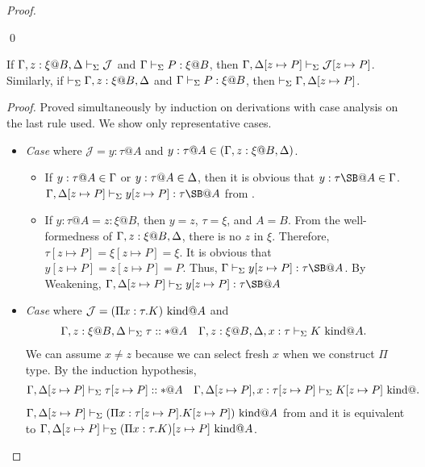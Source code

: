 \begin{proof}
\begin{itemize}
	\end{itemize}
\qed\end{proof}

\begin{theorem}
	If $\G, z:\xi@B, \D \V \mathcal{J}$ and $\Gamma\vdash_\Sigma P:\xi @B$, then $\Gamma, \Delta[z \mapsto P] \vdash_\Sigma \mathcal{J}[z \mapsto P]$.  Similarly, if $\V \G, z:\xi@B, \D$ and
	$\Gamma\vdash_\Sigma P:\xi @B$, then $\vdash_\Sigma \Gamma, \Delta[z \mapsto P]$.
\end{theorem}
\begin{proof}
	Proved simultaneously by induction on derivations with case analysis on the last rule used.
	We show only representative cases.
	\begin{itemize}
										
		\newcommand{\SB}{[z \mapsto P]}
		\newcommand{\GG}{\G}
		\newcommand{\GGV}{\G \V}
										
		\item[] \textit{Case} \TVar{} where \(\mathcal{J} = y:\tau@A\) and \(y:\tau@A \in (\G, z:\xi@B, \D)\).
		      \begin{itemize}
		      	\item If $y:\tau@A \in \G$ or $y:\tau@A \in \D$, then it is obvious that $y:\tau\SB@A \in \GG$.
		      	      \(\G,\D\SB \V y\SB:\tau\SB@A\) from \TVar.
		      	      		      	      	      	      		      	      	      		      	      
		      	\item If $y:\tau@A = z:\xi@B$, then
		      	      $y = z$, $\tau = \xi$, and $A = B$.
		      	      From the well-formedness of \( \G, z:\xi@B,\D \), there is no $z$ in $\xi$.
		      	      Therefore, $\tau\SB = \xi\SB = \xi$.
		      	      It is obvious that $y\SB = z\SB = P$.
		      	      Thus, $\G \V y\SB : \tau\SB@A$.
		      	      By Weakening, $\G,\D\SB \V y\SB : \tau\SB@A$
		      	      		      	      
		      \end{itemize}
		      \vspace{3mm}
		      
		\item[] \textit{Case} \WAbs{} where \( \mathcal{J} =  (\Pi x:\tau.K) \text{\ kind} @A\) and
		      \begin{align*}	      	      	      
		      	  & \G, z:\xi@B, \D \V \tau::*@A &   & \G, z:\xi@B, \D, x:\tau \V K \iskind@A. 
		      \end{align*}
		      We can assume $x \neq z$ because we can select fresh $x$ when we construct $\Pi$ type.
		      By the induction hypothesis,
		      \begin{align*}
		      	  & \G,\D\SB \V \tau\SB::*@A &   & \G,\D\SB, x:\tau\SB \V K\SB \iskind@. 
		      \end{align*}
		      $\G,\D\SB \V (\Pi x:\tau\SB.K\SB) \iskind @A$ from \WAbs{} and 
		      it is equivalent to $\G,\D\SB \V (\Pi x:\tau.K)\SB \iskind @A$.
		      \vspace{3mm}
		      

\end{itemize}
\end{proof}
